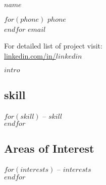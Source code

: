 \documentclass[$fontsize$, a4paper]{article}
\begin{document}
{\LARGE $name$}\\[.2cm]



\begin{multicols}{2}

$for(phone)$
$phone$\\
$endfor$
\href{mailto:$email$}{$email$}\\

\columnbreak

For detailed list of project visit:\\
\href{http://linkedin.com/in/$linkedin$}{linkedin.com/in/$linkedin$}

\end{multicols}

\vspace{10pt}




$intro$

\vspace{5pt}


\begin{multicols}{2}

\subsection*{skill}
$for(skill)$
-- $skill$\\
$endfor$

\columnbreak

\subsection*{Areas of Interest}
$for(interests)$
-- $interests$\\
$endfor$

\end{multicols}


\end{document}
